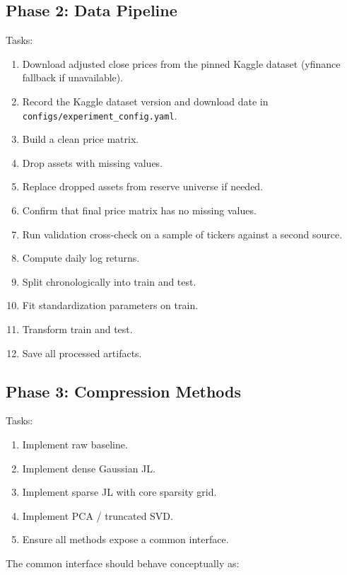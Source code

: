 \documentclass[11pt]{article}
\begin{document}
\subsection{Phase 2: Data Pipeline}

Tasks:

\begin{enumerate}
    \item Download adjusted close prices from the pinned Kaggle dataset (yfinance fallback if unavailable).
    \item Record the Kaggle dataset version and download date in \texttt{configs/experiment\_config.yaml}.
    \item Build a clean price matrix.
    \item Drop assets with missing values.
    \item Replace dropped assets from reserve universe if needed.
    \item Confirm that final price matrix has no missing values.
    \item Run validation cross-check on a sample of tickers against a second source.
    \item Compute daily log returns.
    \item Split chronologically into train and test.
    \item Fit standardization parameters on train.
    \item Transform train and test.
    \item Save all processed artifacts.
\end{enumerate}

\subsection{Phase 3: Compression Methods}

Tasks:

\begin{enumerate}
    \item Implement raw baseline.
    \item Implement dense Gaussian JL.
    \item Implement sparse JL with core sparsity grid.
    \item Implement PCA / truncated SVD.
    \item Ensure all methods expose a common interface.
\end{enumerate}

The common interface should behave conceptually as:
\end{document}
